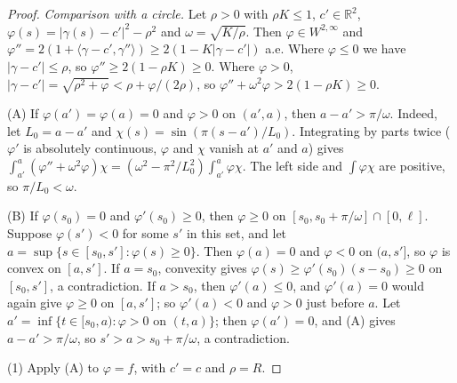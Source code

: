\documentclass[11pt,reqno]{amsart}
\theoremstyle{definition}
\providecommand{\R}{\mathbb{R}}
\numberwithin{equation}{section}
\providecommand{\R}{\mathbb{R}}
\begin{document}
\begin{proof}
\emph{Comparison with a circle.} Let $\rho > 0$ with $\rho K \le 1$, $c' \in \R^2$, $\varphi(s) = |\gamma(s) - c'|^2 - \rho^2$ and $\omega = \sqrt{K/\rho}$. Then $\varphi \in W^{2,\infty}$ and $\varphi'' = 2(1 + \langle \gamma - c', \gamma''\rangle) \ge 2(1 - K|\gamma - c'|)$ a.e. Where $\varphi \le 0$ we have $|\gamma - c'| \le \rho$, so $\varphi'' \ge 2(1 - \rho K) \ge 0$. Where $\varphi > 0$, $|\gamma - c'| = \sqrt{\rho^2 + \varphi} < \rho + \varphi/(2\rho)$, so $\varphi'' + \omega^2\varphi > 2(1 - \rho K) \ge 0$.

(A) If $\varphi(a') = \varphi(a) = 0$ and $\varphi > 0$ on $(a', a)$, then $a - a' > \pi/\omega$. Indeed, let $L_0 = a - a'$ and $\chi(s) = \sin(\pi(s - a')/L_0)$. Integrating by parts twice ($\varphi'$ is absolutely continuous, $\varphi$ and $\chi$ vanish at $a'$ and $a$) gives $\int_{a'}^{a}(\varphi'' + \omega^2\varphi)\chi = (\omega^2 - \pi^2/L_0^2)\int_{a'}^{a}\varphi\chi$. The left side and $\int\varphi\chi$ are positive, so $\pi/L_0 < \omega$.

(B) If $\varphi(s_0) = 0$ and $\varphi'(s_0) \ge 0$, then $\varphi \ge 0$ on $[s_0, s_0 + \pi/\omega] \cap [0, \ell]$. Suppose $\varphi(s') < 0$ for some $s'$ in this set, and let $a = \sup\{s \in [s_0, s'] : \varphi(s) \ge 0\}$. Then $\varphi(a) = 0$ and $\varphi < 0$ on $(a, s']$, so $\varphi$ is convex on $[a, s']$. If $a = s_0$, convexity gives $\varphi(s) \ge \varphi'(s_0)(s - s_0) \ge 0$ on $[s_0, s']$, a contradiction. If $a > s_0$, then $\varphi'(a) \le 0$, and $\varphi'(a) = 0$ would again give $\varphi \ge 0$ on $[a, s']$; so $\varphi'(a) < 0$ and $\varphi > 0$ just before $a$. Let $a' = \inf\{t \in [s_0, a) : \varphi > 0 \text{ on } (t, a)\}$; then $\varphi(a') = 0$, and (A) gives $a - a' > \pi/\omega$, so $s' > a > s_0 + \pi/\omega$, a contradiction.

(1) Apply (A) to $\varphi = f$, with $c' = c$ and $\rho = R$.


\end{proof}
\end{document}
